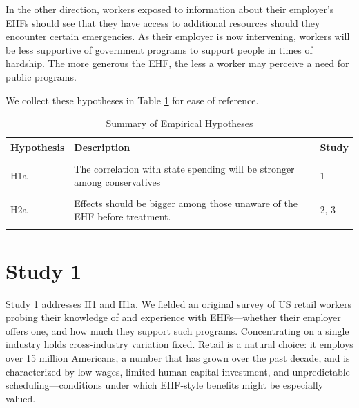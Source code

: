 \documentclass[
  11pt,
  oneside]{article}
\begin{document}
In the other direction, workers exposed to information about their employer's EHFs should see that they have access to additional resources should they encounter certain emergencies. As their employer is now intervening, workers will be less supportive of government programs to support people in times of hardship. The more generous the EHF, the less a worker may perceive a need for public programs.

We collect these hypotheses in Table \ref{tab:tab-hypotheses} for ease of reference.

\begin{table}[!h]
\centering
\caption{\label{tab:tab-hypotheses}Summary of Empirical Hypotheses}
\centering
\begin{tabular}[t]{l>{\raggedright\arraybackslash}p{10cm}l}
\toprule
Hypothesis & Description & Study\\
\midrule
\cellcolor{gray!10}{H1} & \cellcolor{gray!10}{Workers in states with more generous social spending regimes will be less supportive of EHFs and less willing to donate.} & \cellcolor{gray!10}{1, 3}\\
H1a & The correlation with state spending will be stronger among conservatives & 1\\
\cellcolor{gray!10}{H2} & \cellcolor{gray!10}{Exposure to EHF messaging reduces support for government spending on social insurance and welfare.} & \cellcolor{gray!10}{2, 3}\\
H2a & Effects should be bigger among those unaware of the EHF before treatment. & 2, 3\\
\cellcolor{gray!10}{H2b} & \cellcolor{gray!10}{Effects should be bigger where the EHF is more generous.} & \cellcolor{gray!10}{2, 3}\\
\bottomrule
\end{tabular}
\end{table}

\section{Study 1}\label{sec-genpop}

Study 1 addresses H1 and H1a. We fielded an original survey of US retail workers probing their knowledge of and experience with EHFs---whether their employer offers one, and how much they support such programs. Concentrating on a single industry holds cross-industry variation fixed. Retail is a natural choice: it employs over 15 million Americans, a number that has grown over the past decade, and is characterized by low wages, limited human-capital investment, and unpredictable scheduling---conditions under which EHF-style benefits might be especially valued.
\end{document}
